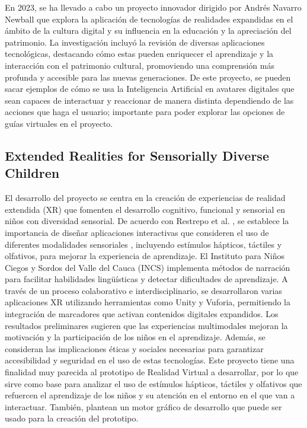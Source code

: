 En 2023, se ha llevado a cabo un proyecto innovador dirigido por Andrés Navarro Newball \cite{6} que explora 
la aplicación de tecnologías de realidades expandidas en el ámbito de la cultura digital y su influencia en la educación
 y la apreciación del patrimonio. La investigación incluyó la revisión de diversas aplicaciones tecnológicas, destacando 
 cómo estas pueden enriquecer el aprendizaje y la interacción con el patrimonio cultural, promoviendo una comprensión más
  profunda y accesible para las nuevas generaciones. De este proyecto, se pueden sacar ejemplos de cómo se usa la Inteligencia
   Artificial en avatares digitales que sean capaces de interactuar y reaccionar de manera distinta dependiendo de las 
   acciones que haga el usuario; importante para poder explorar las opciones de guías virtuales en el proyecto.

\subsection{Extended Realities for Sensorially Diverse Children}

El desarrollo del proyecto se centra en la creación de experiencias de realidad extendida (XR) que fomenten el desarrollo
 cognitivo, funcional y sensorial en niños con diversidad sensorial. De acuerdo con Restrepo et al. \cite{5}, 
 se establece la importancia de diseñar aplicaciones interactivas que consideren el uso de diferentes modalidades sensoriales
 , incluyendo estímulos hápticos, táctiles y olfativos, para mejorar la experiencia de aprendizaje. El Instituto para Niños 
 Ciegos y Sordos del Valle del Cauca (INCS) implementa métodos de narración para facilitar habilidades lingüísticas y detectar
  dificultades de aprendizaje. A través de un proceso colaborativo e interdisciplinario, se desarrollaron varias aplicaciones 
  XR utilizando herramientas como Unity y Vuforia, permitiendo la integración de marcadores que activan contenidos digitales 
  expandidos. Los resultados preliminares sugieren que las experiencias multimodales mejoran la motivación y la participación
  de los niños en el aprendizaje. Además, se consideran las implicaciones éticas y sociales necesarias para garantizar 
  accesibilidad y seguridad en el uso de estas tecnologías. Este proyecto tiene una finalidad muy parecida al prototipo de 
  Realidad Virtual a desarrollar, por lo que sirve como base para analizar el uso de estímulos hápticos, táctiles y olfativos
  que refuercen el aprendizaje de los niños y su atención en el entorno en el que van a interactuar. También, plantean un 
  motor gráfico de desarrollo que puede ser usado para la creación del prototipo.

